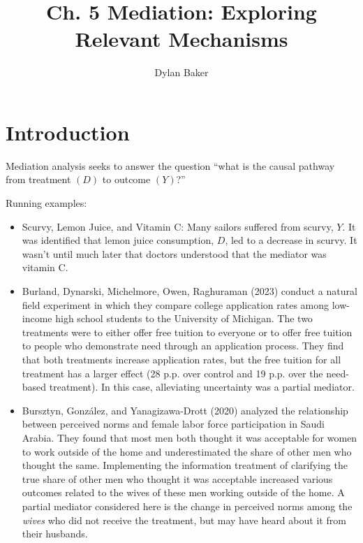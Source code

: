 \documentclass[10pt]{article}
\title{Ch. 5 Mediation: Exploring Relevant Mechanisms}
\author{Dylan Baker}
\begin{document}
\maketitle

\tableofcontents

\section{Introduction}

Mediation analysis 
seeks to answer the question 
``what is the causal pathway from treatment $(D)$ to outcome $(Y)$?''

Running examples:

\begin{itemize}
    \item Scurvy, Lemon Juice, and Vitamin C: 
        Many sailors suffered from scurvy, $Y$. It was identified 
        that lemon juice consumption, $D$, led to a 
        decrease in scurvy. It wasn't until much later that 
        doctors understood that the mediator was vitamin C.
    \item Burland, Dynarski, Michelmore, Owen, Raghuraman (2023)
        conduct a natural field experiment in which they compare 
        college application rates among low-income 
        high school students to the University of Michigan. 
        The two treatments were to either offer free tuition to 
        everyone or to offer free tuition to people who demonstrate 
        need through an application process. They find that both 
        treatments increase application rates, but the
        free tuition for all treatment has a larger effect (28 p.p. over control 
        and 19 p.p. over the need-based treatment). In this case,
        alleviating uncertainty was a partial mediator.
    \item Bursztyn, González, and Yanagizawa-Drott (2020) 
        analyzed the relationship between perceived norms 
        and female labor force participation in Saudi Arabia. 
        They found that most men both thought it was 
        acceptable for women to work outside of the home 
        and underestimated the share of other men who thought the same.
        Implementing the information treatment of clarifying the 
        true share of other men who thought it was acceptable
        increased various outcomes related to the wives of 
        these men working outside of the home. A partial mediator 
        considered here is the change in perceived norms among 
        the \emph{wives} who did not receive the treatment, but 
        may have heard about it from their husbands.
\end{itemize}
\end{document}
